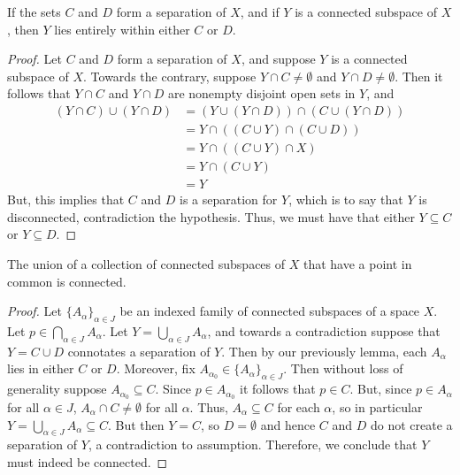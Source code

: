 \documentclass[12pt, a4paper, oneside, openright, titlepage]{book}
\begin{document}
\begin{lem}
    If the sets $C$ and $D$ form a separation of $X$, and if $Y$ is a connected subspace of $X$, then $Y$ lies entirely within either $C$ or $D$.
\end{lem}
\begin{proof}
    Let $C$ and $D$ form a separation of $X$, and suppose $Y$ is a connected subspace of $X$. Towards the contrary, suppose $Y\cap C \neq \emptyset$ and $Y\cap D \neq \emptyset$. Then it follows that $Y\cap C$ and $Y\cap D$ are nonempty disjoint open sets in $Y$, and \begin{align*}
        (Y\cap C)\cup (Y\cap D) &= (Y\cup(Y\cap D))\cap (C\cup(Y\cap D)) \\
        &= Y\cap ((C\cup Y)\cap (C\cup D)) \\
        &= Y\cap ((C\cup Y)\cap X) \\
        &= Y\cap (C\cup Y) \\
        &= Y
    \end{align*}
    But, this implies that $C$ and $D$ is a separation for $Y$, which is to say that $Y$ is disconnected, contradiction the hypothesis. Thus, we must have that either $Y\subseteq C$ or $Y\subseteq D$.
\end{proof}


\begin{thm}
    The union of a collection of connected subspaces of $X$ that have a point in common is connected.
\end{thm}
\begin{proof}
    Let $\{A_{\alpha}\}_{\alpha \in J}$ be an indexed family of connected subspaces of a space $X$. Let $p \in \bigcap_{\alpha \in J}A_{\alpha}$. Let $Y = \bigcup_{\alpha \in J}A_{\alpha}$, and towards a contradiction suppose that $Y = C\cup D$ connotates a separation of $Y$. Then by our previously lemma, each $A_{\alpha}$ lies in either $C$ or $D$. Moreover, fix $A_{\alpha_0} \in \{A_{\alpha}\}_{\alpha \in J}$. Then without loss of generality suppose $A_{\alpha_0} \subseteq C$. Since $p \in A_{\alpha_0}$ it follows that $p \in C$. But, since $p \in A_{\alpha}$ for all $\alpha \in J$, $A_{\alpha} \cap C \neq \emptyset$ for all $\alpha$. Thus, $A_{\alpha} \subseteq C$ for each $\alpha$, so in particular $Y = \bigcup_{\alpha \in J}A_{\alpha} \subseteq C$. But then $Y = C$, so $D = \emptyset$ and hence $C$ and $D$ do not create a separation of $Y$, a contradiction to assumption. Therefore, we conclude that $Y$ must indeed be connected.
\end{proof}
\end{document}
